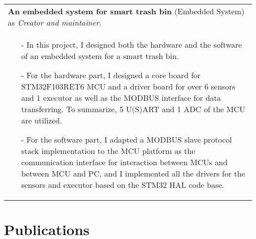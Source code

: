 \documentclass[a4paper,12pt]{article}
\newcommand{\signed}[1]{%
\unskip\nobreak\hfil\penalty50
   \hskip2em\hbox{}\nobreak\hfil#1
   \parfillskip=0pt \finalhyphendemerits=0 }
\begin{document}
\begin{tabularx}{\linewidth}{ @{}X@{} }
    \textbf{An embedded system for smart trash bin} (Embedded System) as \textit{Creator and maintainer}.
    \signed{Dec. 2020 - May 2021} \\[3.75pt]
    \begin{minipage}[t]{\linewidth}
        \begin{itemize}[nosep,after=\strut, leftmargin=1em, itemsep=3pt]
            \item[-] In this project, I designed both the hardware and the software of an embedded system for a smart trash bin.
            \item[-] For the hardware part, I designed a core board for STM32F103RET6 MCU and a driver board for over 6 sensors
            and 1 executor as well as the MODBUS interface for data transferring. To summarize, 5 U(S)ART and 1 ADC of the MCU are utilized.
            \item[-] For the software part, I adapted a MODBUS slave protocol stack implementation to the MCU platform as the communication
            interface for interaction between MCUs and between MCU and PC, and I implemented all the drivers for the sensors and executor
            based on the STM32 HAL code base.
        \end{itemize}
        \end{minipage}
\end{tabularx}

\section{Publications}
\end{document}
